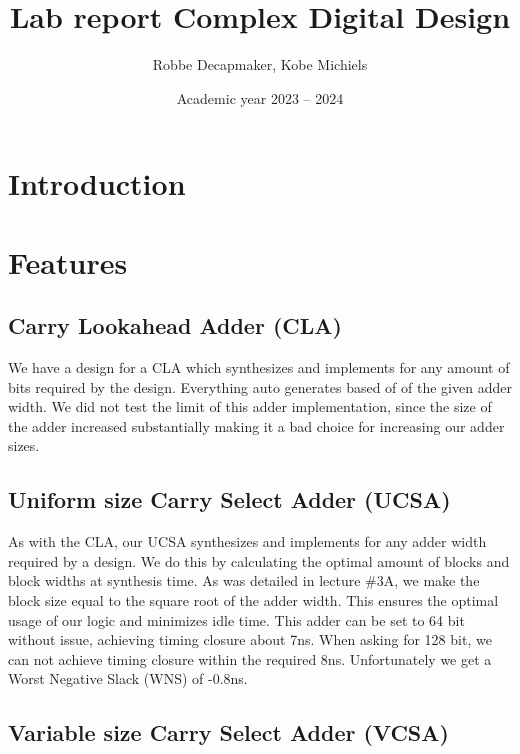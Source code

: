 \documentclass[a4paper,kul]{kulakarticle} %
\date{Academic year 2023 -- 2024}
\title{Lab report Complex Digital Design}
\author{Robbe Decapmaker, Kobe Michiels}
\begin{document}
\maketitle
\section{Introduction}

\section{Features}


\subsection{Carry Lookahead Adder (CLA)}

We have a design for a CLA which synthesizes and implements for any amount of bits required by the design. Everything auto generates based of of the given adder width. We did not test the limit of this adder implementation, since the size of the adder increased substantially making it a bad choice for increasing our adder sizes. 

\subsection{Uniform size Carry Select Adder (UCSA)}

As with the CLA, our UCSA synthesizes and implements for any adder width required by a design. We do this by calculating the optimal amount of blocks and block widths at synthesis time. As was detailed in lecture \#3A, we make the block size equal to the square root of the adder width. This ensures the optimal usage of our logic and minimizes idle time. This adder can be set to 64 bit without issue, achieving timing closure about 7ns. When asking for 128 bit, we can not achieve timing closure within the required 8ns. Unfortunately we get a Worst Negative Slack (WNS) of -0.8ns. 

\subsection{Variable size Carry Select Adder (VCSA)}
\end{document}
